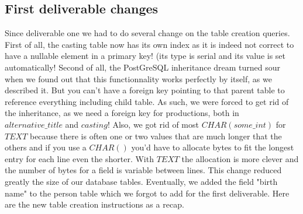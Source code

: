 \documentclass{article}
\begin{document}
\subsection{First deliverable changes}
    Since deliverable one we had to do several change on the table creation queries.
    First of all, the casting table now has its own index as it is indeed not correct to have a nullable element in a primary key! (its type is serial and its value is set automatically!
    Second of all, the PostGreSQL inheritance dream turned sour when we found out that this functionnality works perfectly by itself, as we described it. But you can't have a foreign key pointing to that parent table to reference everything including child table.
    As such, we were forced to get rid of the inheritance, as we need a foreign key for productions, both in $alternative\_title$ and $casting$!
    Also, we got rid of most $CHAR(some\_int)$ for $TEXT$ because there is often one or two values that are much longer that the others and if you use a $CHAR()$ you'd have to allocate bytes to fit the longest entry for each line even the shorter. With $TEXT$ the allocation is more clever and the number of bytes for a field is variable between lines. This change reduced greatly the size of our database tables. 
    Eventually, we added the field "birth name" to the person table which we forgot to add for the first deliverable. 
    Here are the new table creation instructions as a recap.
\end{document}
